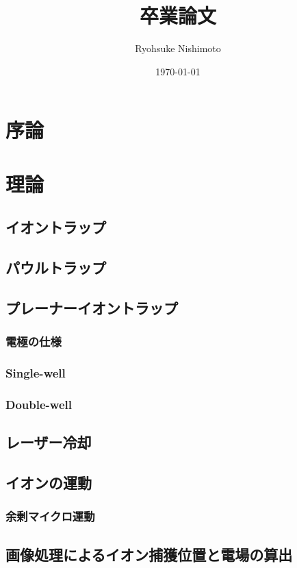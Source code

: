 \documentclass[a4j,10.5pt,titlepage]{jarticle}
\title{卒業論文}
\author{Ryohsuke Nishimoto}
\date{\today}
\begin{document}
\maketitle
{}
\setcounter{tocdepth}{3}
\tableofcontents

\clearpage
{}

\section{序論}
\clearpage
\section{理論}
	\subsection{イオントラップ}
	\subsection{パウルトラップ}
	\subsection{プレーナーイオントラップ}
		\subsubsection{電極の仕様}
		\subsubsection{Single-well}
		\subsubsection{Double-well}
	\subsection{レーザー冷却}
	\subsection{イオンの運動}
		\subsubsection{余剰マイクロ運動}
	\subsection{画像処理によるイオン捕獲位置と電場の算出}
\end{document}
